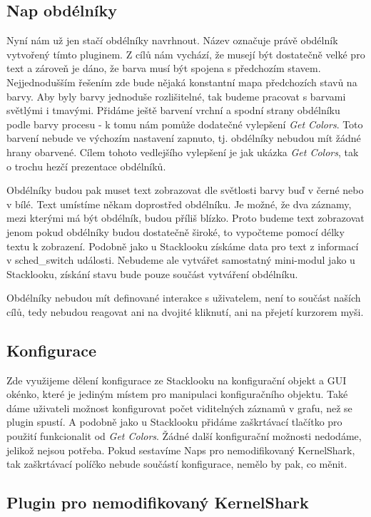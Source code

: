 \subsection{Nap obdélníky}
Nyní nám už jen stačí obdélníky navrhnout. Název  označuje právě obdélník vytvořený tímto pluginem. Z cílů nám vychází, že musejí být dostatečně velké pro text a zároveň je dáno, že barva musí být spojena s předchozím stavem. Nejjednodušším řešením zde bude nějaká konstantní mapa předchozích stavů na barvy. Aby byly barvy jednoduše rozlišitelné, tak budeme pracovat s barvami světlými i tmavými. Přidáme ještě barvení vrchní a spodní strany obdélníku podle barvy procesu - k tomu nám pomůže dodatečné vylepšení \emph{Get Colors}. Toto barvení nebude ve výchozím nastavení zapnuto, tj. obdélníky nebudou mít žádné hrany obarvené. Cílem tohoto vedlejšího vylepšení je jak ukázka \emph{Get Colors}, tak o trochu hezčí prezentace obdélníků.

Obdélníky budou pak muset text zobrazovat dle světlosti barvy buď v černé nebo v bílé. Text umístíme někam doprostřed obdélníku. Je možné, že dva záznamy, mezi kterými má být obdélník, budou příliš blízko. Proto budeme text zobrazovat jenom pokud obdélníky budou dostatečně široké, to vypočteme pomocí délky textu k zobrazení. Podobně jako u Stacklooku získáme data pro text z informací v sched\_switch události. Nebudeme ale vytvářet samostatný mini-modul jako u Stacklooku, získání stavu bude pouze součást vytváření obdélníku.

Obdélníky nebudou mít definované interakce s uživatelem, není to součást naších cílů, tedy nebudou reagovat ani na dvojité kliknutí, ani na přejetí kurzorem myši.

\subsection{Konfigurace}
Zde využijeme dělení konfigurace ze Stacklooku na konfigurační objekt a GUI okénko, které je jediným místem pro manipulaci konfiguračního objektu. Také dáme uživateli možnost konfigurovat počet viditelných záznamů v grafu, než se plugin spustí. A podobně jako u Stacklooku přidáme zaškrtávací tlačítko pro použití funkcionalit od \emph{Get Colors}. Žádné další konfigurační možnosti nedodáme, jelikož nejsou potřeba. Pokud sestavíme Naps pro nemodifikovaný KernelShark, tak zaškrtávací políčko nebude součástí konfigurace, nemělo by pak, co měnit.

\subsection{Plugin pro nemodifikovaný KernelShark}

